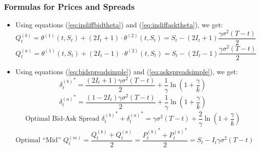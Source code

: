 \documentclass[handout]{beamer}
\begin{document}
\begin{frame}
\frametitle{Formulas for Prices and Spreads}
\pause
\begin{itemize}[<+->]
\item Using equations (\ref{eq:indiffbidtheta}) and (\ref{eq:indiffasktheta}), we get:
\begin{equation}
Q_t^{(b)} = \theta^{(1)}(t,S_t) + (2I_t+1)\cdot \theta^{(2)}(t,S_t) = S_t - (2I_t + 1) \frac {\gamma \sigma^2(T-t)} {2} \label{eq:indiffbidsolve}
\end{equation}
\begin{equation}
Q_t^{(a)} = \theta^{(1)}(t,S_t) + (2I_t-1) \cdot \theta^{(2)}(t,S_t) =  S_t - (2I_t - 1) \frac {\gamma \sigma^2(T-t)} {2} \label{eq:indiffasksolve}
\end{equation}
\item Using equations  (\ref{eq:bidspreadsimple}) and (\ref{eq:askspreadsimple}), we get:
\begin{equation}
{\delta_t^{(b)}}^* =  \frac {(2I_t+1)\gamma \sigma^2(T-t)} {2} + \frac 1 {\gamma} \ln{(1 + \frac {\gamma} k)} \label{eq: bidspreadsolve}
\end{equation}
\begin{equation}
{\delta_t^{(a)}}^*  = \frac {(1-2I_t)\gamma \sigma^2(T-t)} {2} + \frac 1 {\gamma} \ln{(1 + \frac {\gamma} k)} \label{eq: askspreadsolve}
\end{equation}
\begin{equation}
\mbox{Optimal Bid-Ask Spread } {\delta_t^{(b)}}^* + {\delta_t^{(a)}}^* = \gamma \sigma^2(T-t) + \frac 2 {\gamma} \ln{(1 + \frac {\gamma} k)} \label{eq:bidaskspreadsolve}
\end{equation}
\begin{equation}
\mbox{Optimal ``Mid'' } Q_t^{(m)} = \frac {Q_t^{(b)} + Q_t^{(a)}} 2 = \frac {{P_t^{(b)}}^* + {P_t^{(a)}}^*} 2 = S_t - I_t \gamma \sigma^2(T-t) \label{eq:indiffmidsolve}
\end{equation}
\end{itemize}
\end{frame}
\end{document}

